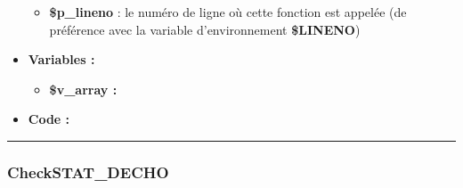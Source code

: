 \documentclass[a4paper,10pt]{article}
\begin{document}
\begin{itemize}
\begin{itemize}
        \item \color{orange}\textbf{\$p\_lineno}\color{white} : le numéro de ligne où cette fonction est appelée (de préférence avec la variable d'environnement \textbf{\color{orange}\$LINENO})\\[1\baselineskip]
    \end{itemize}

    \item \textbf{Variables :}
    \begin{itemize}
        \item \textbf{\color{orange}\$v\_array\color{white} :} \\[1\baselineskip]
    \end{itemize}


    \item \textbf{Code :}
\end{itemize}


\color{blue}\par\noindent\rule{\textwidth}{0.4pt}\color{white}

\color{blue}
\subsubsection{CheckSTAT\_DECHO}\color{white}
\end{document}
